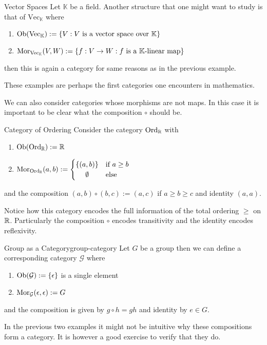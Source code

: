 \begin{example}{Vector Spaces}{}
Let $\mathbb{K}$ be a field. Another structure that one might want to study is that of $\mathrm{Vec}_\mathbb{K}$ where
\begin{enumerate}
    \item $\mathrm {Ob}(\mathrm{Vec}_\mathbb{K}) := \{V : \text{$V$ is a vector space over $\mathbb{K}$}\}$
    \item $\mathrm {Mor}_{\mathrm{Vec}_\mathbb{K}}(V,W) := \{f: V \to W : \text{$f$ is a $\mathbb{K}$-linear map}\}$
\end{enumerate}
then this is again a category for same reasons as in the previous example.
\end{example}
These examples are perhaps the first categories one encounters in mathematics. 

We can also consider categories whose morphisms are not maps. In this case it is important to be clear what the composition $\circ$ should be.

\begin{example}{Category of Ordering}{}
Consider the category $\mathrm{Ord}_\mathbb R$ with
\begin{enumerate}
    \item $\mathrm {Ob}(\mathrm{Ord}_\mathbb R) := \mathbb R$
    \item $\mor_{\mathrm{Ord}_\R}(a,b) := \begin{cases}
        \{(a,b)\} & \text{if $a \ge b$} \\
        \hfil \emptyset & \text{else}
    \end{cases}$
\end{enumerate}
and the composition $(a,b) \circ (b,c) := (a,c)$ if $a \ge b \ge c$ and identity $(a,a)$.

Notice how this category encodes the full information of the total ordering $\ge$ on $\mathbb R$. Particularly the composition $\circ$ encodes transitivity and the identity encodes reflexivity.
\end{example}

\begin{example}{Group as a Category}{group-category}
Let $G$ be a group then we can define a corresponding category $\mathcal{G}$ where
\begin{enumerate}
    \item $\mathrm {Ob}(\mathcal{G}) := \{\epsilon\}$ is a single element
    \item $\mathrm {Mor}_{\mathcal{G}}(\epsilon,\epsilon) := G$
\end{enumerate}
and the composition is given by $g \circ h = gh$ and identity by $e \in G$.
\end{example}
In the previous two examples it might not be intuitive why these compositions form a category. It is however a good exercise to verify that they do.

